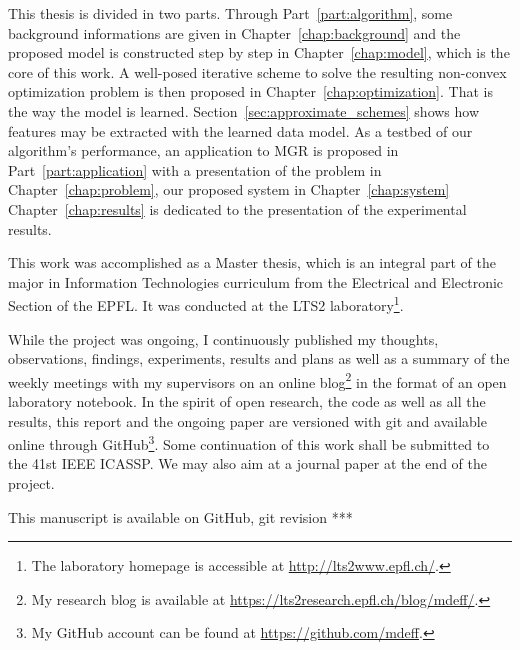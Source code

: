\documentclass[a4paper,12pt,oneside]{report}
\newcommand{\partref}[1]{Part~\ref{part:#1}}
\newcommand{\chapref}[1]{Chapter~\ref{chap:#1}}
\newcommand{\secref}[1]{Section~\ref{sec:#1}}
\begin{document}
This thesis is divided in two parts. Through \partref{algorithm},
some background informations are given in \chapref{background} and the proposed model is
constructed step by step in \chapref{model}, which is the core of this work. A well-posed iterative scheme to solve the resulting non-convex optimization problem is then proposed in \chapref{optimization}. That is the way the model is learned. %
\secref{approximate_schemes} shows how features may be extracted with the learned data model.
As a testbed of our algorithm's performance, an application to \gls{MGR} is proposed in \partref{application} with a presentation of the problem in \chapref{problem}, our proposed system in \chapref{system}
\chapref{results} is dedicated to the presentation of the experimental results.



This work was accomplished as a Master thesis, which is an integral part of the major in Information Technologies curriculum from the Electrical and Electronic Section of the \gls{EPFL}. It was conducted at the LTS2 laboratory\footnote{The laboratory homepage is accessible at \url{http://lts2www.epfl.ch/}.}.

While the project was ongoing, I continuously published my thoughts, observations, findings, experiments, results and plans as well as a summary of the weekly meetings with my supervisors on an online blog\footnote{My research blog is available at \url{https://lts2research.epfl.ch/blog/mdeff/}.} in the format of an open laboratory notebook. In the spirit of open research, the code as well as all the results, this report and the ongoing paper are versioned with git and available online through GitHub\footnote{My GitHub account can be found at \url{https://github.com/mdeff}.}. Some continuation of this work shall be submitted to the 41st IEEE \gls{ICASSP}. We may also aim at a journal paper at the end of the project.

This manuscript is available on GitHub, git revision ***








\end{document}
